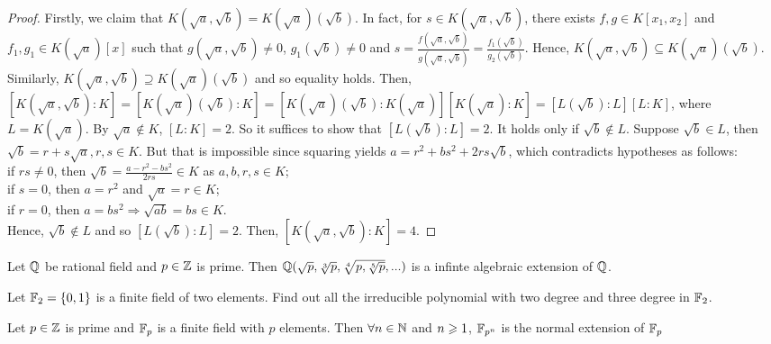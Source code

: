\begin{proof}
    Firstly, we claim that $K(\sqrt{a},\sqrt{b})=K(\sqrt{a})(\sqrt{b})$. In fact, 
    for $s\in K(\sqrt{a},\sqrt{b})$, 
    there exists $f,g\in K[x_1,x_2]$ and $f_1,g_1\in K(\sqrt{a})[x]$ such that $g(\sqrt{a},\sqrt{b})\neq 0$, $g_1(\sqrt{b})\neq 0$ 
    and $s=\frac{f(\sqrt{a},\sqrt{b})}{g(\sqrt{a},\sqrt{b})}=\frac{f_1(\sqrt{b})}{g_2(\sqrt{b})}$.
    Hence, $K(\sqrt{a},\sqrt{b})\subseteq K(\sqrt{a})(\sqrt{b})$.
    Similarly, $K(\sqrt{a},\sqrt{b})\supseteq K(\sqrt{a})(\sqrt{b})$ and so equality holds.
    Then, $[K(\sqrt{a},\sqrt{b}):K]=[K(\sqrt{a})(\sqrt{b}):K]=[K(\sqrt{a})(\sqrt{b}):K(\sqrt{a})][K(\sqrt{a}):K]=[L(\sqrt{b}):L][L:K]$, where $L=K(\sqrt{a})$.
    By $\sqrt{a}\notin K$, $[L:K]=2$. So it suffices to show that $[L(\sqrt{b}):L]=2$. It holds only if $\sqrt{b}\notin L$.
    Suppose $\sqrt{b}\in L$, then $\sqrt{b}=r+s\sqrt{a},r,s\in K$. But that is impossible since squaring yields 
    $a=r^2+bs^2+2rs\sqrt{b}$, which contradicts hypotheses as follows:\\
    if $rs\neq 0$, then $\sqrt{b}=\frac{a-r^2-bs^2}{2rs}\in K$ as $a,b,r,s\in K$;\\
    if $s=0$, then $a=r^2$ and $\sqrt{a}=r\in K$;\\
    if $r=0$, then $a= bs^2\Rightarrow \sqrt{ab}=bs\in K$.\\
    Hence, $\sqrt{b}\notin L$ and so $[L(\sqrt{b}):L]=2$.
    Then, $[K(\sqrt{a},\sqrt{b}):K]=4$.
\end{proof}

\begin{exercise}{}{}
    Let $\mathbb{Q}$ be rational field and $p\in\mathbb{Z}$ is prime. Then $\mathbb{Q}(\sqrt{p},\sqrt[3]{p},\sqrt[4]{p,\sqrt[5]{p}},...)$ is a infinte algebraic extension of $\mathbb{Q}$.
\end{exercise}

\begin{exercise}{}{}
    Let $\mathbb{F}_2=\{0,1\}$ is a finite field of two elements. Find out all the irreducible polynomial with two degree and three degree in $\mathbb{F}_2$.
\end{exercise}

\begin{exercise}{}{}
    Let $p\in\mathbb{Z}$ is prime and $\mathbb{F}_p$ is a finite field with $p$ elements. Then $\forall n\in \mathbb{N}$ and $n\geqslant 1$, 
    $\mathbb{F}_{p^n}$ is the normal extension of $\mathbb{F}_p$
\end{exercise}




